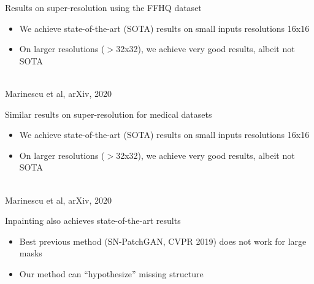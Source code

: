 \begin{frame}{Results on super-resolution using the FFHQ dataset}

\begin{itemize}
 \item We achieve state-of-the-art (SOTA) results on small inputs resolutions 16x16
 \item On larger resolutions ($>$32x32), we achieve very good results, albeit not SOTA
\end{itemize}

\begin{center}
\vo
{}\\
\small{Marinescu et al, arXiv, 2020}
\end{center}
 
\end{frame}

\begin{frame}{Similar results on super-resolution for medical datasets}

\begin{itemize}
 \item We achieve state-of-the-art (SOTA) results on small inputs resolutions 16x16
 \item On larger resolutions ($>$32x32), we achieve very good results, albeit not SOTA
\end{itemize}

\vspace{-1em}

\begin{center}
{}\\
\small{Marinescu et al, arXiv, 2020}
\end{center}
 
\end{frame}

\begin{frame}{Inpainting also achieves state-of-the-art results}

\begin{itemize}
 \item Best previous method (SN-PatchGAN, CVPR 2019) does not work for large masks
 \item Our method can ``hypothesize'' missing structure
\end{itemize}

\begin{center}
{}
\end{center}
 
\end{frame}

